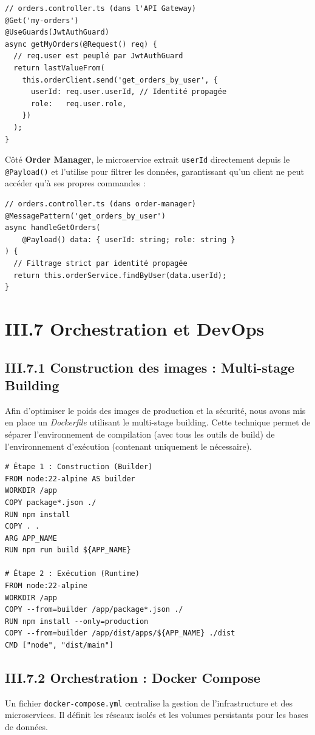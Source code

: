 \begin{verbatim}
// orders.controller.ts (dans l'API Gateway)
@Get('my-orders')
@UseGuards(JwtAuthGuard)
async getMyOrders(@Request() req) {
  // req.user est peuplé par JwtAuthGuard
  return lastValueFrom(
    this.orderClient.send('get_orders_by_user', {
      userId: req.user.userId, // Identité propagée
      role:   req.user.role,
    })
  );
}
\end{verbatim}

Côté \textbf{Order Manager}, le microservice extrait \texttt{userId} directement depuis le \texttt{@Payload()} et l'utilise pour filtrer les données, garantissant qu'un client ne peut accéder qu'à ses propres commandes :

\begin{verbatim}
// orders.controller.ts (dans order-manager)
@MessagePattern('get_orders_by_user')
async handleGetOrders(
    @Payload() data: { userId: string; role: string }
) {
  // Filtrage strict par identité propagée
  return this.orderService.findByUser(data.userId);
}
\end{verbatim}

\section{III.7 Orchestration et DevOps}
\label{sec:devops}

\subsection{III.7.1 Construction des images : Multi-stage Building}
Afin d'optimiser le poids des images de production et la sécurité, nous avons mis en place un \textit{Dockerfile} utilisant le multi-stage building. Cette technique permet de séparer l'environnement de compilation (avec tous les outils de build) de l'environnement d'exécution (contenant uniquement le nécessaire).

\begin{verbatim}
# Étape 1 : Construction (Builder)
FROM node:22-alpine AS builder
WORKDIR /app
COPY package*.json ./
RUN npm install
COPY . .
ARG APP_NAME
RUN npm run build ${APP_NAME}

# Étape 2 : Exécution (Runtime)
FROM node:22-alpine
WORKDIR /app
COPY --from=builder /app/package*.json ./
RUN npm install --only=production
COPY --from=builder /app/dist/apps/${APP_NAME} ./dist
CMD ["node", "dist/main"]
\end{verbatim}

\subsection{III.7.2 Orchestration : Docker Compose}
Un fichier \texttt{docker-compose.yml} centralise la gestion de l'infrastructure et des microservices. Il définit les réseaux isolés et les volumes persistants pour les bases de données.

